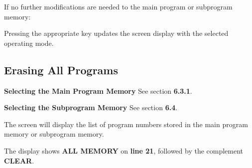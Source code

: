 If no further modifications are needed to the main program or subprogram memory:

\begin{itemize}
\end{itemize}

\vspace{.5cm}

Pressing the appropriate key updates the screen display with the selected operating mode.

\subsection{Erasing All Programs}

\begin{itemize}
\end{itemize}

\vspace{.5cm}

\textbf{Selecting the Main Program Memory}  
See section \textbf{6.3.1}.

\textbf{Selecting the Subprogram Memory}  
See section \textbf{6.4}.

The screen will display the list of program numbers stored in the main program memory or subprogram memory.

\begin{itemize}
\end{itemize}

\vspace{.5cm}

\begin{itemize}
\end{itemize}

\vspace{.5cm}

The display shows \textbf{ALL MEMORY} on \textbf{line 21}, followed by the complement \textbf{CLEAR}.

\begin{itemize}
\end{itemize}

